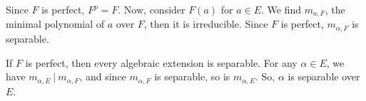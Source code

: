 \documentclass[lang=en,11pt,a4paper,citestyle =authoryear]{elegantpaper}
\begin{document}
Since $F$ is perfect, $F^p=F$. Now, consider $F(a)$ for $a\in E$. We find $m_{a, F}$, the minimal polynomial of $a$ over $F$, then it is irreducible. Since $F$ is perfect, $m_{\alpha, F}$ is separable. \par
If $F$ is perfect, then every algebraic extension is separable. For any $\alpha\in E$, we have $m_{\alpha, E}\ |\ m_{\alpha, F}$, and since $m_{\alpha, F}$ is separable, so is $m_{\alpha, E}$. So, $\alpha$ is separable over $E$.
\par 
\vspace{0.5em}


\addappheadtotoc
\end{document}
